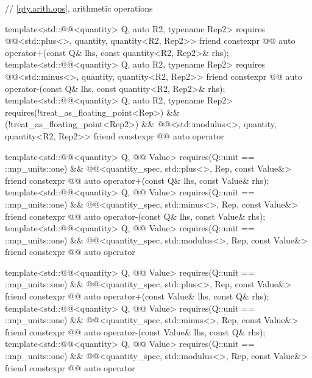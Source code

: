 \begin{codeblock}
{{  // \ref{qty.arith.ops}, arithmetic operations

  template<std::@@<quantity> Q, auto R2, typename Rep2>
    requires @@<std::plus<>, quantity, quantity<R2, Rep2>>
  friend constexpr @@ auto operator+(const Q& lhs, const quantity<R2, Rep2>& rhs);
  template<std::@@<quantity> Q, auto R2, typename Rep2>
    requires @@<std::minus<>, quantity, quantity<R2, Rep2>>
  friend constexpr @@ auto operator-(const Q& lhs, const quantity<R2, Rep2>& rhs);
  template<std::@@<quantity> Q, auto R2, typename Rep2>
    requires(!treat_as_floating_point<Rep>) && (!treat_as_floating_point<Rep2>) &&
            @@<std::modulus<>, quantity, quantity<R2, Rep2>>
  friend constexpr @@ auto operator%

  template<std::@@<quantity> Q, @@ Value>
    requires(Q::unit == ::mp_units::one) &&
            @@<quantity_spec, std::plus<>, Rep, const Value&>
  friend constexpr @@ auto operator+(const Q& lhs, const Value& rhs);
  template<std::@@<quantity> Q, @@ Value>
    requires(Q::unit == ::mp_units::one) &&
            @@<quantity_spec, std::minus<>, Rep, const Value&>
  friend constexpr @@ auto operator-(const Q& lhs, const Value& rhs);
  template<std::@@<quantity> Q, @@ Value>
    requires(Q::unit == ::mp_units::one) &&
            @@<quantity_spec, std::modulus<>, Rep, const Value&>
  friend constexpr @@ auto operator%

  template<std::@@<quantity> Q, @@ Value>
    requires(Q::unit == ::mp_units::one) &&
            @@<quantity_spec, std::plus<>, Rep, const Value&>
  friend constexpr @@ auto operator+(const Value& lhs, const Q& rhs);
  template<std::@@<quantity> Q, @@ Value>
    requires(Q::unit == ::mp_units::one) &&
            @@<quantity_spec, std::minus<>, Rep, const Value&>
  friend constexpr @@ auto operator-(const Value& lhs, const Q& rhs);
  template<std::@@<quantity> Q, @@ Value>
    requires(Q::unit == ::mp_units::one) &&
            @@<quantity_spec, std::modulus<>, Rep, const Value&>
  friend constexpr @@ auto operator%

}}
\end{codeblock}
